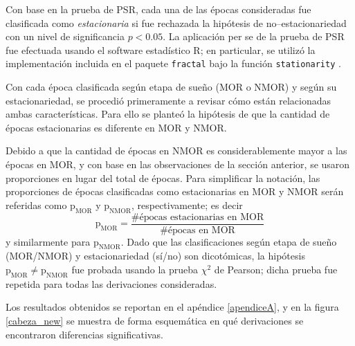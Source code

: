 \documentclass[12pt,letterpaper]{book}
\begin{document}
Con base en la prueba de PSR, cada una de las épocas consideradas fue clasificada como \textit{estacionaria} si fue rechazada la hipótesis de no--estacionariedad con un nivel de significancia $p<0.05$.
%
La aplicación per se de la prueba de PSR fue efectuada usando el software estadístico R; en particular, se utilizó la implementación incluida en el paquete \texttt{fractal} bajo la función \texttt{stationarity} \cite{R_fractal}.

Con cada época clasificada según etapa de sueño (MOR o NMOR) y según su estacionariedad, se procedió primeramente a revisar cómo están relacionadas ambas características.
%
Para ello se planteó la hipótesis de que la cantidad de épocas estacionarias es diferente en MOR y NMOR. 

Debido a que la cantidad de épocas en NMOR es considerablemente mayor a las épocas en MOR, y con base en las observaciones de la sección anterior, se usaron proporciones en lugar del total de épocas.
%
Para simplificar la notación, las proporciones de épocas clasificadas como estacionarias en MOR y NMOR serán referidas como $\text{p}_{\text{MOR}}$ y $\text{p}_{\text{NMOR}}$, respectivamente; es decir
\begin{equation}
\text{p}_{\text{MOR}} = \frac{\text{\# épocas estacionarias en MOR}}{\text{\# épocas en MOR}}
\end{equation}
y similarmente para $\text{p}_{\text{NMOR}}$.
%
Dado que las clasificaciones según etapa de sueño (MOR/NMOR) y estacionariedad (sí/no) son dicotómicas, la hipótesis $\text{p}_{\text{MOR}}\neq\text{p}_{\text{NMOR}}$ fue probada usando la prueba $\chi^{2}$ de Pearson; dicha prueba fue repetida para todas las derivaciones consideradas.

Los resultados obtenidos se reportan en el apéndice \ref{apendiceA}, y en la figura \ref{cabeza_new} se muestra de forma esquemática en qué derivaciones se encontraron diferencias significativas.
\end{document}
